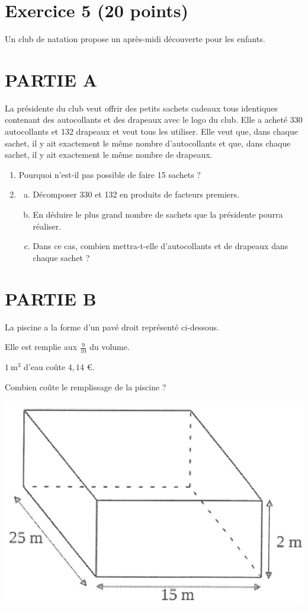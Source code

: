 \documentclass[a4paper,14pt]{extarticle}
\begin{document}
\section*{Exercice 5 (20 points)}
Un club de natation propose un après-midi découverte pour les enfants.

\section*{PARTIE A}
La présidente du club veut offrir des petits sachets cadeaux tous identiques contenant des autocollants et des drapeaux avec le logo du club. Elle a acheté 330 autocollants et 132 drapeaux et veut tous les utiliser. Elle veut que, dans chaque sachet, il y ait exactement le même nombre d'autocollants et que, dans chaque sachet, il y ait exactement le même nombre de drapeaux.

\begin{enumerate}[1.]
  \item Pourquoi n'est-il pas possible de faire 15 sachets ?

  \item  \begin{enumerate}[a.] 

    \item Décomposer 330 et 132 en produits de facteurs premiers.

    \item En déduire le plus grand nombre de sachets que la présidente pourra réaliser.

    \item Dans ce cas, combien mettra-t-elle d'autocollants et de drapeaux dans chaque sachet ?
  \end{enumerate}
\end{enumerate}

\section*{PARTIE B}
La piscine a la forme d'un pavé droit représenté ci-dessous.

Elle est remplie aux $\frac{9}{10}$ du volume.

$1 \mathrm{~m}^{3}$ d'eau coûte $4,14$ €.

Combien coûte le remplissage de la piscine ?

\begin{center}
\includegraphics[max width=.5\textwidth]{piscine}
\end{center}
\end{document}
